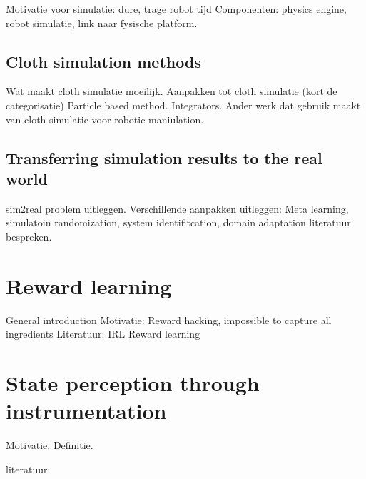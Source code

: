 \documentclass[\home/main.tex]{subfiles}
\begin{document}
Motivatie voor simulatie: dure, trage robot tijd 
Componenten: physics engine, robot simulatie, link naar fysische platform.

\subsection{Cloth simulation methods} \label{subsec:lit_cloth_sim}

Wat maakt cloth simulatie moeilijk. 
Aanpakken tot cloth simulatie (kort de categorisatie)
Particle based method. 
Integrators. 
Ander werk dat gebruik maakt van cloth simulatie voor robotic maniulation.

\subsection{Transferring simulation results to the real world}  \label{sec:lit_sim2real}
sim2real problem uitleggen.
Verschillende aanpakken uitleggen: Meta learning, simulatoin randomization, system identifitcation, domain adaptation
literatuur bespreken. 

\section{Reward learning}  \label{sec:lit_reward_learning}
General introduction 
Motivatie: Reward hacking, impossible to capture all ingredients
Literatuur: 
	IRL 
	Reward learning 

\section{State perception through instrumentation} \label{sec:lit_instrumentation}
Motivatie.
Definitie.

literatuur:
\end{document}

